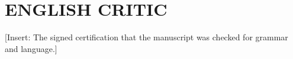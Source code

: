 \chapter{ENGLISH CRITIC}
[Insert: The signed certification that the manuscript was checked for grammar and language.]
